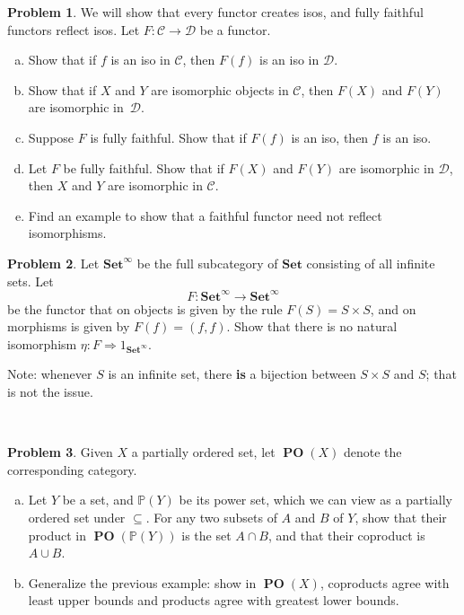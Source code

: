 \documentclass[11pt]{article}
\DeclareMathOperator{\PO}{\mathbf{PO}}
\newcommand{\Set}{\mathbf{Set}}
\theoremstyle{definition}
\newtheorem{problem}{Problem}
\begin{document}
\begin{problem}
We will show that every functor creates isos, and fully faithful functors reflect isos. Let $F\!: \mathscr{C} \to \mathscr{D}$ be a functor.
\begin{enumerate}[a)]
	\item Show that if $f$ is an iso in $\mathscr{C}$, then $F(f)$ is an iso in $\mathscr{D}$.
	\item Show that if $X$ and $Y$ are isomorphic objects in $\mathscr{C}$, then $F(X)$ and $F(Y)$ are isomorphic in~$\mathscr{D}$.
	\item Suppose $F$ is fully faithful. Show that if $F(f)$ is an iso, then $f$ is an iso.
	\item Let $F$ be fully faithful. Show that if $F(X)$ and $F(Y)$ are isomorphic in $\mathscr{D}$, then $X$ and $Y$ are isomorphic in $\mathscr{C}$.
	\item Find an example to show that a faithful functor need not reflect isomorphisms.
\end{enumerate}
\end{problem}

\vfill

\newpage

\begin{problem}
Let $\Set^\infty$ be the full subcategory of $\Set$ consisting of all infinite sets. Let 
$$F\!:\Set^\infty \to \Set^\infty$$ 
be the functor that on objects is given by the rule $F(S)=S\times S$, and on morphisms is given by $F(f)=(f,f)$. Show that there is no natural isomorphism $\eta: F\Rightarrow 1_{\Set^{\infty}}$.

\vspace{0.5em}

\noindent
Note: whenever $S$ is an infinite set, there {\bf is} a bijection between $S \times S$ and $S$; that is not the issue.
\end{problem}

\



\begin{problem}
Given $X$ a partially ordered set, let {\bf $\PO(X)$} denote the corresponding category. 
\begin{enumerate}[a)]
	\item Let $Y$ be a set, and $\mathbb{P}(Y)$ be its power set, which we can view as a partially ordered set under $\subseteq$. For any two subsets of $A$ and $B$ of $Y$, show that their product in $\PO(\mathbb{P}(Y))$ is the set $A \cap B$, and that their coproduct is $A \cup B$.
	\item Generalize the previous example: show in {\bf $\PO(X)$}, coproducts agree with least upper bounds and products agree with greatest lower bounds.
\end{enumerate}
\end{problem}
\end{document}
